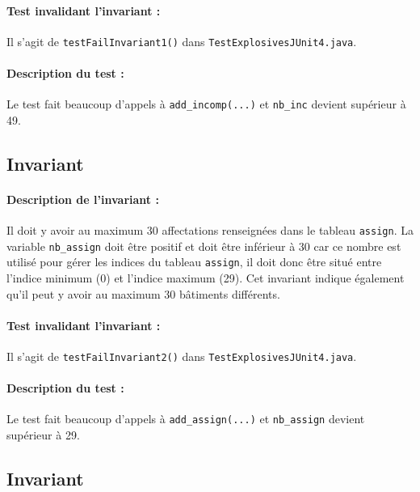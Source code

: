 \documentclass{article}
\begin{document}
\paragraph{Test invalidant l'invariant :} Il s'agit de \texttt{testFailInvariant1()} dans \texttt{TestExplosivesJUnit4.java}.

\vspace{-0.2cm}
\paragraph{Description du test :} Le test fait beaucoup d'appels à \texttt{add\_incomp(...)} et \texttt{nb\_inc} devient supérieur à 49.  

\subsection{Invariant }

\paragraph{Description de l'invariant :} Il doit y avoir au maximum 30 affectations renseignées dans le tableau \texttt{assign}. La variable \texttt{nb\_assign} doit être positif et doit être inférieur à 30 car ce nombre est utilisé pour gérer les indices du tableau \texttt{assign}, il doit donc être situé entre l'indice minimum (0) et l'indice maximum (29). Cet invariant indique également qu'il peut y avoir au maximum 30 bâtiments différents.

\vspace{-0.2cm}
\paragraph{Test invalidant l'invariant :} Il s'agit de \texttt{testFailInvariant2()} dans \texttt{TestExplosivesJUnit4.java}.

\vspace{-0.2cm}
\paragraph{Description du test :} Le test fait beaucoup d'appels à \texttt{add\_assign(...)} et \texttt{nb\_assign} devient supérieur à 29. 

\subsection{Invariant }
\end{document}
